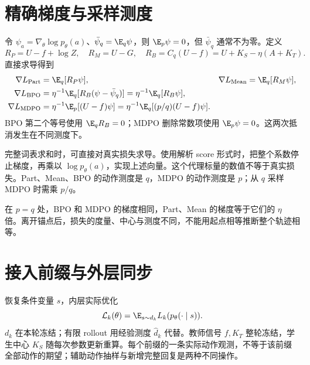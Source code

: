 \section{精确梯度与采样测度}
令 $\psi_a=\nabla_\theta\log p_\theta(a)$、$\bar\psi_q=\E_q\psi$，则 $\E_p\psi=0$，但 $\bar\psi_q$ 通常不为零。定义
\begin{equation}
R_P=U-f+\log Z,\quad R_M=U-G,\quad
R_B=C_q(U-f)=U+K_S-\eta(A+K_T).
\end{equation}
直接求导得到
\begin{align}
\nabla L_{\rm Part}&=\E_q[R_P\psi],&
\nabla L_{\rm Mean}&=\E_q[R_M\psi],\\
\nabla L_{\rm BPO}
&=\eta^{-1}\E_q[R_B(\psi-\bar\psi_q)]
=\eta^{-1}\E_q[R_B\psi],\label{eq:bpo-gradient}\\
\nabla L_{\rm MDPO}
&=\eta^{-1}\E_p[(U-f)\psi]
=\eta^{-1}\E_q[(p/q)(U-f)\psi].\label{eq:mdpo-gradient}
\end{align}
BPO 第二个等号使用 $\E_qR_B=0$；MDPO 删除常数项使用 $\E_p\psi=0$。这两次抵消发生在不同测度下。

完整词表求和时，可直接对真实损失求导。使用解析 score 形式时，把整个系数停止梯度，再乘以 $\log p_\theta(a)$，实现上述向量。这个代理标量的数值不等于真实损失。Part、Mean、BPO 的动作测度是 $q$，MDPO 的动作测度是 $p$；从 $q$ 采样 MDPO 时需乘 $p/q$。

在 $p=q$ 处，BPO 和 MDPO 的梯度相同，Part、Mean 的梯度等于它们的 $\eta$ 倍。离开锚点后，损失的度量、中心与测度不同，不能用起点相等推断整个轨迹相等。

\section{接入前缀与外层同步}
恢复条件变量 $s$，内层实际优化
\begin{equation}
\mathcal L_k(\theta)=\E_{s\sim d_k}L_k(p_\theta(\cdot\mid s)).
\end{equation}
$d_k$ 在本轮冻结；有限 rollout 用经验测度 $\widehat d_k$ 代替。教师信号 $f,K_T$ 整轮冻结，学生中心 $K_S$ 随每次参数更新重算。每个前缀的一条实际动作观测，不等于该前缀全部动作的期望；辅助动作抽样与新增完整回复是两种不同操作。

